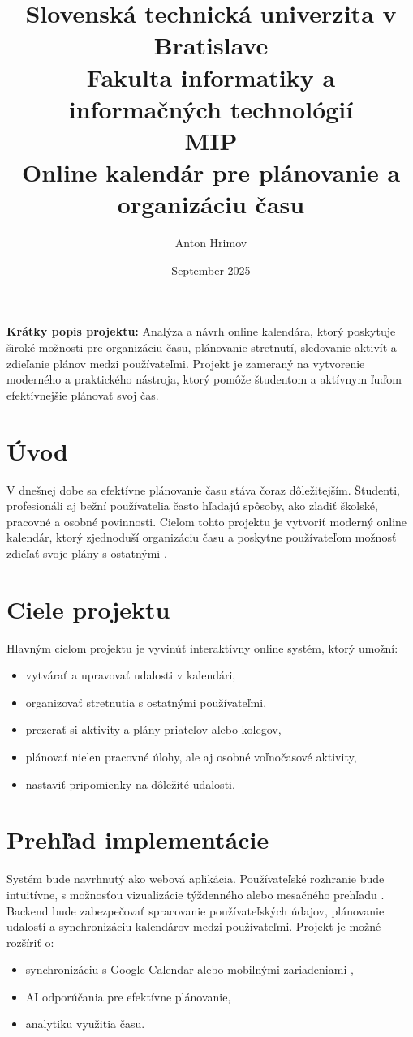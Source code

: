 \documentclass[a4paper,12pt]{article}
\title{
    Slovenská technická univerzita v Bratislave\\
    Fakulta informatiky a informačných technológií\\[1em]
    \large MIP\\[2em]
    \textbf{Online kalendár pre plánovanie a organizáciu času}
}
\author{Anton Hrimov}
\date{September 2025}
\begin{document}
\maketitle
\thispagestyle{empty}

\vspace{1cm}
\textbf{Krátky popis projektu:}  
Analýza a návrh online kalendára, ktorý poskytuje široké možnosti pre organizáciu času, plánovanie stretnutí, sledovanie aktivít a zdieľanie plánov medzi používateľmi. Projekt je zameraný na vytvorenie moderného a praktického nástroja, ktorý pomôže študentom a aktívnym ľuďom efektívnejšie plánovať svoj čas.

\newpage

\section{Úvod}
V dnešnej dobe sa efektívne plánovanie času stáva čoraz dôležitejším. Študenti, profesionáli aj bežní používatelia často hľadajú spôsoby, ako zladiť školské, pracovné a osobné povinnosti.  
Cieľom tohto projektu je vytvoriť moderný online kalendár, ktorý zjednoduší organizáciu času a poskytne používateľom možnosť zdieľať svoje plány s ostatnými \cite{newport_deepwork}.

\section{Ciele projektu}
Hlavným cieľom projektu je vyvinúť interaktívny online systém, ktorý umožní:
\begin{itemize}
    \item vytvárať a upravovať udalosti v kalendári,
    \item organizovať stretnutia s ostatnými používateľmi,
    \item prezerať si aktivity a plány priateľov alebo kolegov,
    \item plánovať nielen pracovné úlohy, ale aj osobné voľnočasové aktivity,
    \item nastaviť pripomienky na dôležité udalosti.
\end{itemize}

\section{Prehľad implementácie}
Systém bude navrhnutý ako webová aplikácia. Používateľské rozhranie bude intuitívne, s možnosťou vizualizácie týždenného alebo mesačného prehľadu \cite{nielsen_usability}.  
Backend bude zabezpečovať spracovanie používateľských údajov, plánovanie udalostí a synchronizáciu kalendárov medzi používateľmi.  
Projekt je možné rozšíriť o:
\begin{itemize}
    \item synchronizáciu s Google Calendar alebo mobilnými zariadeniami \cite{google_calendarapi},
    \item AI odporúčania pre efektívne plánovanie,
    \item analytiku využitia času.
\end{itemize}
\end{document}
